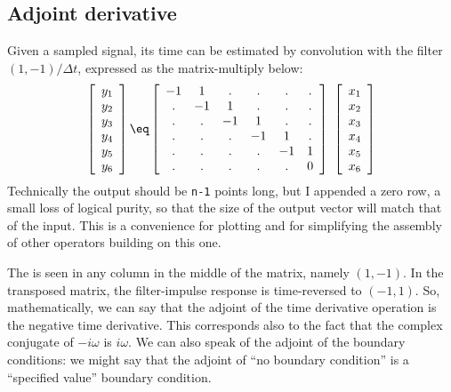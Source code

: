 \subsection{Adjoint derivative}
Given a sam\-pled sig\-nal,
its time  can be esti\-mated
by con\-vo\-lu\-tion with the fil\-ter $(1,-1)/\Delta t$,
expressed as the matrix-multiply below:
\begin{equation}
\left[ \begin{array}{c}
	y_1 \\
	y_2 \\
	y_3 \\
	y_4 \\
	y_5 \\
	y_6
	\end{array} \right]
\eq
\left[ \begin{array}{cccccc}
	-1& 1& .& .& .& . \\
	 .&-1& 1& .& .& . \\
	 .& .&-1& 1& .& . \\
	 .& .& .&-1& 1& . \\
	 .& .& .& .&-1& 1 \\
	 .& .& .& .& .& 0
	\end{array} \right] \
\left[ \begin{array}{c}
	x_1 \\
	x_2 \\
	x_3 \\
	x_4 \\
	x_5 \\
	x_6
	\end{array} \right]
 \label{eqn:ruff1}
\end{equation}
Technically the output should be {\tt n-1} points long,
but I appended a zero row,
a small loss of logical purity,
so that the size of the output vector will match that of the input.
This is a convenience for plotting
and for simplifying the assembly of other operators building on this one.
\par
The  is seen in any column
in the middle of the matrix, namely $(1,-1)$.
In the transposed matrix,
the filter-impulse response
is time-reversed to $(-1,1)$.
So, mathematically,
we can say that the adjoint of the time derivative operation
is the negative time derivative.
This corresponds also to the fact that
the complex conjugate of $-i\omega$ is $i\omega$.
We can also speak of the adjoint of the boundary conditions:
we might say that the adjoint of ``no boundary condition''
is a ``specified value'' boundary condition.
\par
